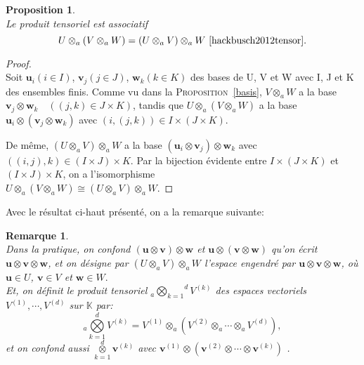 \documentclass[11pt,a4paper,oneside]{book}
\newtheorem{prop}{Proposition}[chapter]
\newtheorem{rem}{Remarque}[chapter]
\newtheorem{proof}{Démonstration}
\def\K{\mathbb K}
\def\agktensor{_{a}\overset{d}{\underset{k=1}{\bigotimes}}}
\def\ktensor{\overset{d}{\underset{k=1}{\otimes}}}
\def\v{\mathbf v}
\def\u{\mathbf u}
\def\w{\mathbf w}
\newcommand{\propref}[1]{\textsc{Proposition}~\ref{#1}}
\begin{document}
\begin{prop}
	\emph{\\}
		Le produit tensoriel est associatif 
		\begin{equation}
		U\otimes_{a}(V\otimes_{a} W)=(U\otimes_{a} V)\otimes_{a} W \text{   \cite[p.56]{hackbusch2012tensor}}.
		\end{equation}
\end{prop}
\begin{proof}
	\emph{\\}
	Soit $ \u_{i}(i\in I) $, $ \v_{j}(j\in J) $, $ \w_{k}(k\in K) $ des bases de U, V et W avec I, J et K des ensembles finis. Comme vu dans la \propref{basis}, $ V\otimes_{a} W $ a la base $ \v_{j}\otimes \w_{k}\quad((j,k)\in J\times K) $, tandis que $ U\otimes_{a} (V \otimes_{a} W) $ a la base $ \u_{i}\otimes( \v_{j}\otimes \w_{k}) $ avec $ (i,(j,k))\in I\times (J\times K) $.
	
	De même, $ (U\otimes_{a} V)\otimes_{a} W $ a la base $ (\u_{i}\otimes \v_{j})\otimes \w_{k} $ avec $ ((i,j),k)\in (I\times J)\times K $.
	Par la bijection évidente entre $ I\times (J\times K)  $ et $ (I\times J)\times K  $, on a l'isomorphisme \\
	$ U\otimes_{a} (V \otimes_{a} W)\cong  (U\otimes_{a} V) \otimes_{a} W$.
\end{proof}
 Avec le résultat ci-haut présenté, on a la remarque suivante:
 \begin{rem}
 \emph{\\}
 Dans la pratique, on confond $ (\u \otimes \v)\otimes \w $ et $ \u\otimes  (\v\otimes \w) $
 qu’on écrit $ \u \otimes \v\otimes \w $, et on désigne par $ (U \otimes_{a} V)\otimes_{a} W $ l’espace engendré par
 $ \u \otimes \v\otimes \w $, où $ \u\in U $, $ \v\in V $ et $ \w\in W .$\\
 Et, on définit le produit tensoriel $ \agktensor V^{(k)}  $
 des espaces vectoriels $ V^{(1)},\cdots,V^{(d)} $ sur $ \K $ par:
 $$\agktensor V^{(k)}=V^{(1)}\otimes_{a}(V^{(2)}\otimes_{a} \cdots\otimes_{a} V^{(d)}), $$
 et on confond aussi $ \ktensor \v^{(k)} $ avec $ \v^{(1)}\otimes (\v^{(2)}\otimes\cdots\otimes \v^{(k)}) $ {\rmfamily \cite[p.16]{Awanegeo}}.
 \end{rem}
\end{document}
